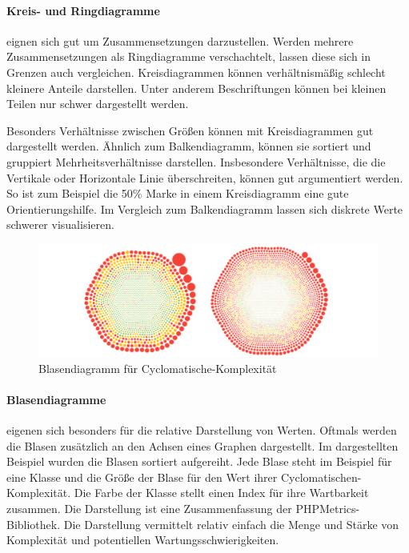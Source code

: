 \paragraph{Kreis- und Ringdiagramme} eignen sich gut um Zusammensetzungen darzustellen. Werden mehrere Zusammensetzungen als Ringdiagramme verschachtelt, lassen diese sich in Grenzen auch vergleichen. Kreisdiagrammen können verhältnismäßig schlecht kleinere Anteile darstellen. Unter anderem Beschriftungen können bei kleinen Teilen nur schwer dargestellt werden.

Besonders Verhältnisse zwischen Größen können mit Kreisdiagrammen gut dargestellt werden. Ähnlich zum Balkendiagramm, können sie sortiert und gruppiert Mehrheitsverhältnisse darstellen. Insbesondere Verhältnisse, die die Vertikale oder Horizontale Linie überschreiten, können gut argumentiert werden. So ist zum Beispiel die 50\% Marke in einem Kreisdiagramm eine gute Orientierungshilfe. Im Vergleich zum Balkendiagramm lassen sich diskrete Werte schwerer visualisieren.

\begin{figure}[htbp]
  \includegraphics[width=\textwidth, height=\textheight, keepaspectratio]
    {resources/bubble-complexity-chart.pdf}
  \caption{Blasendiagramm für Cyclomatische-Komplexität}
  \label{bubble-complexity}
\end{figure}
\paragraph{Blasendiagramme} eigenen sich besonders für die relative Darstellung von Werten. Oftmals werden die Blasen zusätzlich an den Achsen eines Graphen dargestellt. Im dargestellten Beispiel wurden die Blasen sortiert aufgereiht. Jede Blase steht im Beispiel für eine Klasse und die Größe der Blase für den Wert ihrer Cyclomatischen-Komplexität. Die Farbe der Klasse stellt einen Index für ihre Wartbarkeit zusammen. Die Darstellung ist eine Zusammenfassung der PHPMetrics-Bibliothek. 
Die Darstellung vermittelt relativ einfach die Menge und Stärke von Komplexität und potentiellen Wartungsschwierigkeiten.


